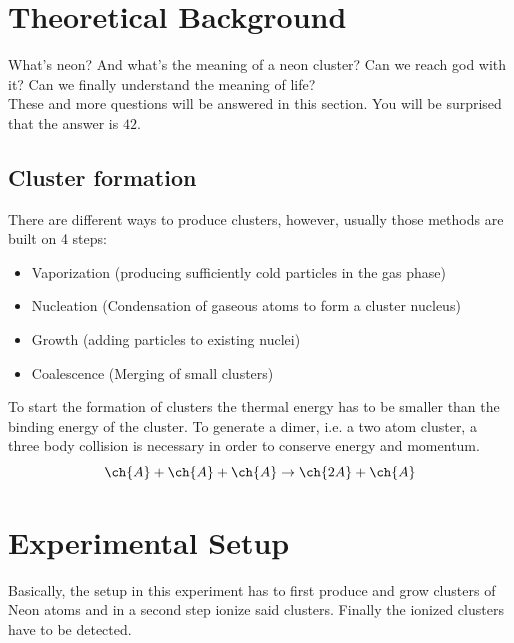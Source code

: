 \documentclass[a4paper,10pt]{article}
\begin{document}
\section{Theoretical Background}

What's neon? And what's the meaning of a neon cluster? Can we reach god with it? Can we finally understand the meaning of life?\\
These and more questions will be answered in this section. You will be surprised that the answer is $42$. 

\subsection{Cluster formation}
There are different ways to produce clusters, however, usually those methods are built on 4 steps:
\begin{itemize}
	\item Vaporization (producing sufficiently cold particles in the gas phase)
	\item Nucleation (Condensation of gaseous atoms to form a cluster nucleus)
	\item Growth (adding particles to existing nuclei)
	\item Coalescence (Merging of small clusters) 
\end{itemize}
To start the formation of clusters the thermal energy has to be smaller than the binding energy of the cluster. To generate a dimer, i.e. a two atom cluster, a three body collision is necessary in order to conserve energy and momentum. 
\begin{equation}
	\ch{A} + \ch{A} + \ch{A} \rightarrow \ch{2 A} + \ch{A}
\end{equation}

\section{Experimental Setup}
Basically, the setup in this experiment has to first produce and grow clusters of Neon atoms and in a second step ionize said clusters. Finally the ionized clusters have to be detected. 
\end{document}
